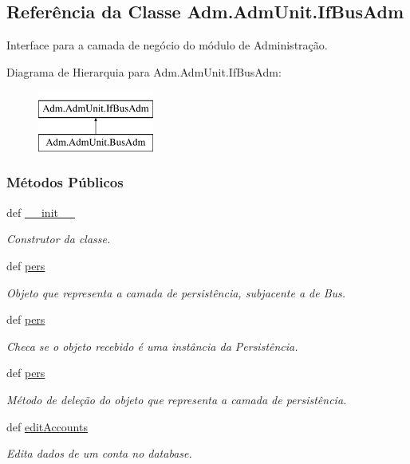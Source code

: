 \hypertarget{classAdm_1_1AdmUnit_1_1IfBusAdm}{\subsection{Referência da Classe Adm.\-Adm\-Unit.\-If\-Bus\-Adm}
\label{classAdm_1_1AdmUnit_1_1IfBusAdm}
}


Interface para a camada de negócio do módulo de Administração.  


Diagrama de Hierarquia para Adm.\-Adm\-Unit.\-If\-Bus\-Adm\-:\begin{figure}[H]
\begin{center}
\leavevmode
\includegraphics[height=2.000000cm]{d3/d53/classAdm_1_1AdmUnit_1_1IfBusAdm}
\end{center}
\end{figure}
\subsubsection*{Métodos Públicos}
\begin{DoxyCompactItemize}
\item 
def \hyperlink{classAdm_1_1AdmUnit_1_1IfBusAdm_abe924f0f983b1fe97ca466907d35c834}{\-\_\-\-\_\-init\-\_\-\-\_\-}
\begin{DoxyCompactList}\small\item\em Construtor da classe. \end{DoxyCompactList}\item 
def \hyperlink{classAdm_1_1AdmUnit_1_1IfBusAdm_a31857b146085382c8d778ae90cd46c6f}{pers}
\begin{DoxyCompactList}\small\item\em Objeto que representa a camada de persistência, subjacente a de Bus. \end{DoxyCompactList}\item 
def \hyperlink{classAdm_1_1AdmUnit_1_1IfBusAdm_a31857b146085382c8d778ae90cd46c6f}{pers}
\begin{DoxyCompactList}\small\item\em Checa se o objeto recebido é uma instância da Persistência. \end{DoxyCompactList}\item 
def \hyperlink{classAdm_1_1AdmUnit_1_1IfBusAdm_a31857b146085382c8d778ae90cd46c6f}{pers}
\begin{DoxyCompactList}\small\item\em Método de deleção do objeto que representa a camada de persistência. \end{DoxyCompactList}\item 
def \hyperlink{classAdm_1_1AdmUnit_1_1IfBusAdm_a4dd3605edbfe5fdc729fdeceec5ab879}{edit\-Accounts}
\begin{DoxyCompactList}\small\item\em Edita dados de um conta no database. \end{DoxyCompactList}\end{DoxyCompactItemize}
